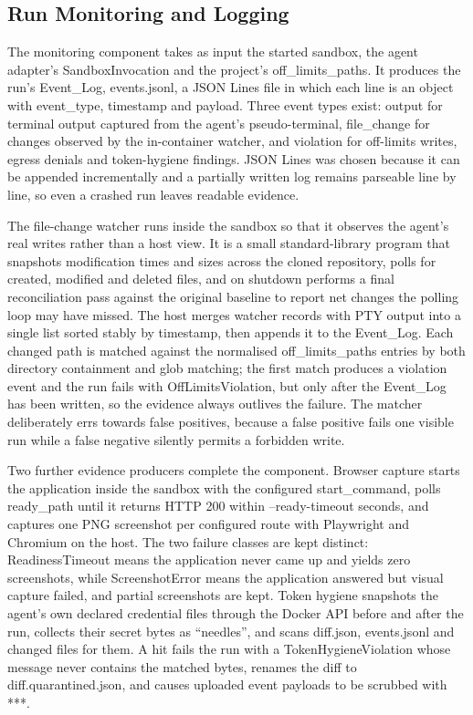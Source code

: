\documentclass[12pt,a4paper,oneside]{report}
\begin{document}
\subsection{Run Monitoring and Logging}\label{run-monitoring-and-logging}

The monitoring component takes as input the started sandbox, the agent adapter's SandboxInvocation and the project's off\_\allowbreak{}limits\_\allowbreak{}paths. It produces the run's Event\_Log, events.jsonl, a JSON Lines file in which each line is an object with event\_type, timestamp and payload. Three event types exist: output for terminal output captured from the agent's pseudo-terminal, file\_\allowbreak{}change for changes observed by the in-container watcher, and violation for off-limits writes, egress denials and token-hygiene findings. JSON Lines was chosen because it can be appended incrementally and a partially written log remains parseable line by line, so even a crashed run leaves readable evidence.

The file-change watcher runs inside the sandbox so that it observes the agent's real writes rather than a host view. It is a small standard-library program that snapshots modification times and sizes across the cloned repository, polls for created, modified and deleted files, and on shutdown performs a final reconciliation pass against the original baseline to report net changes the polling loop may have missed. The host merges watcher records with PTY output into a single list sorted stably by timestamp, then appends it to the Event\_Log. Each changed path is matched against the normalised off\_\allowbreak{}limits\_\allowbreak{}paths entries by both directory containment and glob matching; the first match produces a violation event and the run fails with OffLimitsViolation, but only after the Event\_Log has been written, so the evidence always outlives the failure. The matcher deliberately errs towards false positives, because a false positive fails one visible run while a false negative silently permits a forbidden write.

Two further evidence producers complete the component. Browser capture starts the application inside the sandbox with the configured start\_\allowbreak{}command, polls ready\_path until it returns HTTP 200 within --ready-timeout seconds, and captures one PNG screenshot per configured route with Playwright and Chromium on the host. The two failure classes are kept distinct: ReadinessTimeout means the application never came up and yields zero screenshots, while ScreenshotError means the application answered but visual capture failed, and partial screenshots are kept. Token hygiene snapshots the agent's own declared credential files through the Docker API before and after the run, collects their secret bytes as ``needles'', and scans diff.json, events.jsonl and changed files for them. A hit fails the run with a TokenHygieneViolation whose message never contains the matched bytes, renames the diff to diff.quarantined.json, and causes uploaded event payloads to be scrubbed with ***.
\end{document}
